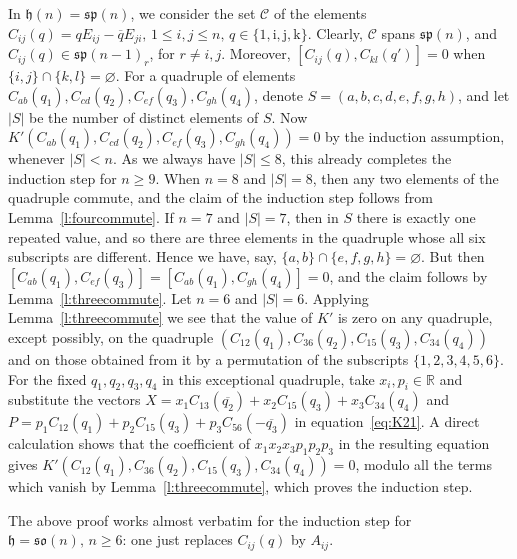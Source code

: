 \documentclass[12pt,reqno]{amsart}
\newcommand \br{\mathbb{R}}
\newcommand \cC{\mathcal{C}}
\newcommand\h{\mathfrak h}
\newcommand \so{\mathfrak{so}}
\newcommand \spg{\mathfrak{sp}}
\newcommand \ir{\mathrm{i}}
\newcommand \jr{\mathrm{j}}
\newcommand \kr{\mathrm{k}}
\newcommand \<{\langle}
\renewcommand \>{\rangle}
\theoremstyle{definition}
\theoremstyle{remark}
\begin{document}
	In $\h(n)=\spg(n)$, we consider the set $\cC$ of the elements $C_{ij}(q) = q E_{ij} - \overline{q} E_{ji}, \, 1 \le i,j \le n, \, q \in \{1,\ir,\jr,\kr\}$. Clearly, $\cC$ spans $\spg(n)$, and $C_{ij}(q) \in \spg(n-1)_r$, for $r \ne i,j$. Moreover, $[C_{ij}(q), C_{kl}(q')] = 0$ when $\{i,j\} \cap \{k,l\} = \varnothing$. For a quadruple of elements $C_{ab}(q_1), C_{cd}(q_2), C_{ef}(q_3), C_{gh}(q_4)$, denote $S = (a,b,c,d,e,f,g,h)$, and let $|S|$ be the number of distinct elements of $S$. Now $K'(C_{ab}(q_1), C_{cd}(q_2), C_{ef}(q_3), C_{gh}(q_4)) = 0$ by the induction assumption, whenever $|S| < n$. As we always have $|S| \le 8$, this already completes the induction step for $n \ge 9$. When $n = 8$ and $|S| = 8$, then any two elements of the quadruple commute, and the claim of the induction step follows from Lemma~\ref{l:fourcommute}. If $n = 7$ and $|S| = 7$, then in $S$ there is exactly one repeated value, and so there are three elements in the quadruple whose all six subscripts are different. Hence we have, say, $\{a,b\} \cap \{e,f,g,h\} = \varnothing$. But then $[C_{ab}(q_1), C_{ef}(q_3)] = [C_{ab}(q_1), C_{gh}(q_4)] = 0$, and the claim follows by Lemma~\ref{l:threecommute}. Let $n = 6$ and $|S|=6$. Applying Lemma~\ref{l:threecommute} we see that the value of $K'$ is zero on any quadruple, except possibly, on the quadruple $(C_{12}(q_1),C_{36}(q_2),C_{15}(q_3),C_{34}(q_4))$ and on those obtained from it by a permutation of the subscripts $\{1,2,3,4,5,6\}$. For the fixed $q_1,q_2,q_3,q_4$ in this exceptional quadruple, take $x_i,p_i \in \br$ and substitute the vectors $X=x_1 C_{13}(\overline{q_2})+x_2 C_{15}(q_3)+x_3 C_{34}(q_4)$ and $P = p_1 C_{12}(q_1) + p_2 C_{15}(q_3) + p_3 C_{56}(-\overline{q_3})$ in equation~\eqref{eq:K21}. A direct calculation shows that the coefficient of $x_1x_2x_3p_1p_2p_3$ in the resulting equation gives $K'(C_{12}(q_1),C_{36}(q_2),C_{15}(q_3),C_{34}(q_4))=0$, modulo all the terms which vanish by Lemma~\ref{l:threecommute}, which proves the induction step.
	
	The above proof works almost verbatim for the induction step for $\h=\so(n), \, n \ge 6$: one just replaces $C_{ij}(q)$ by $A_{ij}$.
	
\end{document}
